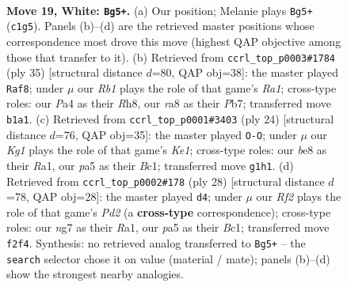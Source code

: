 \documentclass[11pt]{article}
\begin{document}
\clearpage

\begin{figure}[p]\centering
\begin{subfigure}{0.46\textwidth}\centering
\resizebox{\linewidth}{!}{%
\newchessgame
\chessboard[
  setfen={rn2bbr1/1p2k1np/4p1p1/p1P5/P1B1P3/2N5/1P3RPP/1RB1N1K1 w - - 0 19},
  showmover=false,
  pgfstyle=straightmove, color=movearrow, markmove={c1-g5}
]}
\caption{}
\end{subfigure}\hfill
\begin{subfigure}{0.46\textwidth}\centering
\resizebox{\linewidth}{!}{%
\newchessgame
\chessboard[
  setfen={r6r/pppkn2p/2bpn3/5p2/3P3P/2PN4/PP1N2P1/2K1RB1R b - - 7 18},
  showmover=false,
  pgfstyle=straightmove, color=movearrow, markmove={a8-f8}
]}
\caption{}
\end{subfigure}
\\[4pt]
\begin{subfigure}{0.46\textwidth}\centering
\resizebox{\linewidth}{!}{%
\newchessgame
\chessboard[
  setfen={r3kb1r/ppnb1ppp/8/4p3/1n6/1NN3P1/PP2PPBP/R1B1K2R w KQkq - 4 13},
  showmover=false,
  pgfstyle=straightmove, color=movearrow, markmove={e1-g1}
]}
\caption{}
\end{subfigure}\hfill
\begin{subfigure}{0.46\textwidth}\centering
\resizebox{\linewidth}{!}{%
\newchessgame
\chessboard[
  setfen={rn2k1nr/3b1ppp/1pp5/3pP3/1p3P2/1N5P/P2P2P1/R1B1KB1R w KQkq - 0 15},
  showmover=false,
  pgfstyle=straightmove, color=movearrow, markmove={d2-d4}
]}
\caption{}
\end{subfigure}
\caption{\textbf{Move 19, White: \texttt{Bg5+}.} (a) Our position; Melanie plays \texttt{Bg5+} (\texttt{c1g5}). Panels (b)--(d) are the retrieved master positions whose correspondence most drove this move (highest QAP objective among those that transfer to it). (b) Retrieved from \texttt{ccrl\_top\_p0003\#1784} (ply 35) [structural distance $d$=80, QAP obj=38]: the master played \texttt{Raf8}; under $\mu$ our \emph{Rb1} plays the role of that game's \emph{Ra1}; cross-type roles: our \emph{P}a4 as their \emph{R}h8, our \emph{r}a8 as their \emph{P}b7; transferred move \texttt{b1a1}. (c) Retrieved from \texttt{ccrl\_top\_p0001\#3403} (ply 24) [structural distance $d$=76, QAP obj=35]: the master played \texttt{O-O}; under $\mu$ our \emph{Kg1} plays the role of that game's \emph{Ke1}; cross-type roles: our \emph{b}e8 as their \emph{R}a1, our \emph{p}a5 as their \emph{B}c1; transferred move \texttt{g1h1}. (d) Retrieved from \texttt{ccrl\_top\_p0002\#178} (ply 28) [structural distance $d$=78, QAP obj=28]: the master played \texttt{d4}; under $\mu$ our \emph{Rf2} plays the role of that game's \emph{Pd2} (a \textbf{cross-type} correspondence); cross-type roles: our \emph{n}g7 as their \emph{R}a1, our \emph{p}a5 as their \emph{B}c1; transferred move \texttt{f2f4}. Synthesis: no retrieved analog transferred to \texttt{Bg5+} -- the \texttt{search} selector chose it on value (material / mate); panels (b)--(d) show the strongest nearby analogies.}
\label{fig:thought-m36}
\end{figure}
\end{document}
